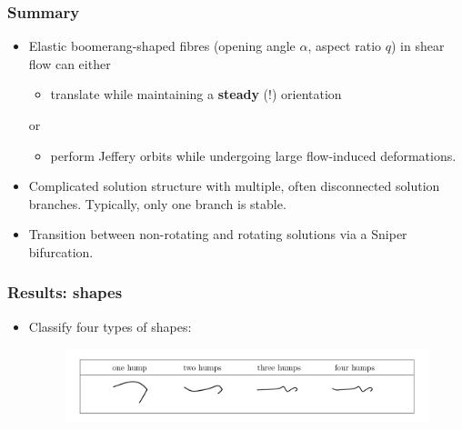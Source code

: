 \documentclass{beamer}
\newcommand{\bi}{\begin{itemize}}
\newcommand{\ei}{\end{itemize}}
\begin{document}
\begin{frame}
	\frametitle{Summary}
	\begin{overlayarea}{\textwidth}{\textheight}
		\bi
		\item  Elastic boomerang-shaped fibres (opening angle $\alpha$, aspect ratio $q$) in shear flow can either
		\bi
		\item translate while maintaining a \textbf{steady} (!) orientation 
		\ei
		or
		\bi
		\item perform Jeffery orbits while undergoing large flow-induced deformations.
		\ei 
		\item Complicated solution structure with multiple, often disconnected solution branches. Typically, only one branch is stable.
		\item Transition between non-rotating and rotating solutions via a Sniper bifurcation.
		\ei
	\end{overlayarea}
\end{frame}




\begin{frame}
	\frametitle{Results: shapes}
	\begin{overlayarea}{\textwidth}{\textheight}
\begin{itemize}
	\item Classify four types of shapes: \vspace{-0.3cm}
	\begin{figure}[htb]
		\begin{center}
			\includegraphics[width=1\textwidth]{plots/deformations.png}
		\end{center}
	\end{figure}
\end{itemize}
	\end{overlayarea}
\end{frame}



\end{document}
